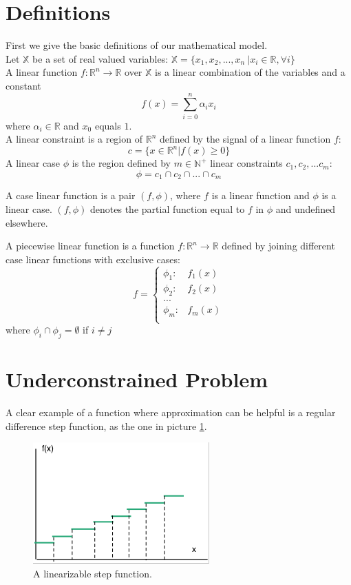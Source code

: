 \section{Definitions} 
\label{appA} 

First we give the basic definitions of our mathematical model.\\
Let  $\mathbb{X}$ be a set of real valued variables: $\mathbb{X} = \{ x_1, x_2, ... , x_n\ | x_i \in \mathbb{R}, \forall i\}$\\
A linear function $f: \mathbb{R}^n \rightarrow \mathbb{R}$ over $\mathbb{X}$ is a linear combination of the variables and a constant 
$$f(x) = \sum_{i=0}^n { \alpha_i x_i}$$ where $\alpha_i \in \mathbb{R}$ and $x_0$ equals $1$.\\
A linear constraint is a region of $\mathbb{R}^n$ defined by the signal of a linear function $f$:
$$c = \{	x \in \mathbb{R}^n | f(x) \geq 0 \} $$
A linear case $\phi$ is the region defined by $m \in \mathbb{N}^+$ linear constraints $c_1, c_2, ... c_m$:
$$ \phi =c_1 \cap c_2 \cap ... \cap c_m $$

A case linear function is a pair $(f, \phi)$, where $f$ is a linear function and $\phi$ is a linear case.  $(f, \phi)$ denotes the partial function equal to $f$ in $\phi$ and undefined elsewhere.

A piecewise linear function is a function $f: \mathbb{R}^n \rightarrow \mathbb{R}$ defined by joining different case linear functions with exclusive cases:
$$ f = 
\left\{
	\begin{array}{ll}
		\phi_1 : & f_1(x)\\
		\phi_2 : & f_2(x)\\
		... & \\
		\phi_m : & f_m(x)\\
	\end{array}
\right.
$$
where $\phi_i \cap \phi_j = \emptyset$ if $i \neq j$

\section{Underconstrained Problem} 
\label{appB} 

A clear example of a function where approximation can be helpful is a regular difference step function, as the one in picture \ref{stepf}. 
\begin{figure}[!h]
\center
\includegraphics[scale=0.9]{Figures/step.png}
\caption{A linearizable step function.}
\label{stepf} 
\end{figure}

